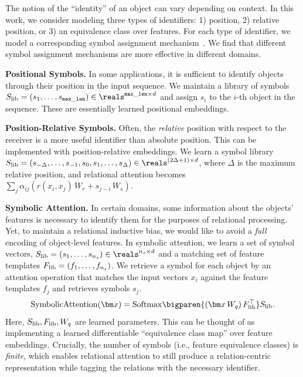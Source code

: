 The notion of the ``identity'' of an object can vary depending on context. In this work, we consider modeling three types of identifiers: 1) position, 2) relative position, or 3) an equivalence class over features. For each type of identifier, we model a corresponding symbol assignment mechanism~\citep{altabaa2024abstractors}. We find that different symbol assignment mechanisms are more effective in different domains.

\textbf{Positional Symbols.} In some applications, it is sufficient to identify objects through their position in the input sequence. We maintain a library of symbols $\Slib = (s_1, \ldots, s_{\mathtt{max\_len}}) \in \reals^{\mathtt{max\_len} \times d}$ and assign $s_i$ to the $i$-th object in the sequence. These are essentially learned positional embeddings.

\textbf{Position-Relative Symbols.} Often, the \textit{relative} position with respect to the receiver is a more useful identifier than absolute position. This can be implemented with position-relative embeddings. We learn a symbol library $\Slib = (s_{-\Delta}, \ldots, s_{-1}, s_0, s_1, \ldots, s_{\Delta}) \in \reals^{(2 \Delta + 1) \times d}$, where $\Delta$ is the maximum relative position, and relational attention becomes $\sum_{j} \alpha_{ij}  (r(x_i, x_j) \, W_r + s_{j-i} \,  W_s)$.

\textbf{Symbolic Attention.} In certain domains, some information about the objects' features is necessary to identify them for the purposes of relational processing. Yet, to maintain a relational inductive bias, we would like to avoid a \textit{full} encoding of object-level features. In symbolic attention, we learn a set of symbol vectors, $\Slib = (s_1, \ldots, s_{n_s}) \in \reals^{n_s \times d}$ and a matching set of feature templates $F_\mathrm{lib} = (f_1, \ldots, f_{n_s})$. We retrieve a symbol for each object by an attention operation that matches the input vectors $x_i$ against the feature templates $f_j$ and retrieves symbols $s_j$.
\begin{equation}
  \SymbolicAttn(\x) = \Softmax\bigparen{(\x \, W_q)\, \Flib^\top} \Slib.
\end{equation}
Here, $S_\mathrm{lib}, F_\mathrm{lib}, W_q$ are learned parameters. This can be thought of as implementing a learned differentiable ``equivalence class map'' over feature embeddings. Crucially, the number of symbols (i.e., feature equivalence classes) is \textit{finite}, which enables relational attention to still produce a relation-centric representation while tagging the relations with the necessary identifier.

